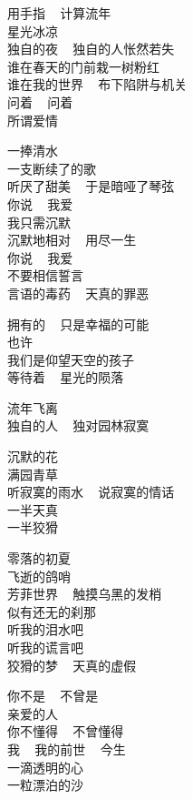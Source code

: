 	\longpoem{}{}{}

		用手指 ~ 计算流年 \\
		星光冰凉 \\
		独自的夜 ~ 独自的人怅然若失 \\
		谁在春天的门前栽一树粉红 \\
		谁在我的世界 ~ 布下陷阱与机关 \\
		问着 ~ 问着 \\
		所谓爱情

		一捧清水 \\
		一支断续了的歌 \\
		听厌了甜美 ~ 于是暗哑了琴弦 \\
		你说 ~ 我爱 \\
		我只需沉默 \\
		沉默地相对 ~ 用尽一生 \\
		你说 ~ 我爱 \\
		不要相信誓言 \\
		言语的毒药 ~ 天真的罪恶

		拥有的 ~ 只是幸福的可能 \\
		也许 \\
		我们是仰望天空的孩子 \\
		等待着 ~ 星光的陨落

		流年飞离 \\
		独自的人 ~ 独对园林寂寞

	\endlongpoem
	\endwriting


	\longpoem{}{}{}

		沉默的花 \\
		满园青草 \\
		听寂寞的雨水 ~ 说寂寞的情话 \\
		一半天真 \\
		一半狡猾

		零落的初夏 \\
		飞逝的鸽哨 \\
		芳菲世界 ~ 触摸乌黑的发梢 \\
		似有还无的刹那 \\
		听我的泪水吧 \\
		听我的谎言吧 \\
		狡猾的梦 ~ 天真的虚假

		你不是 ~ 不曾是 \\
		亲爱的人 \\
		你不懂得 ~ 不曾懂得 \\
		我 ~ 我的前世 ~ 今生 \\
		一滴透明的心 \\
		一粒漂泊的沙

